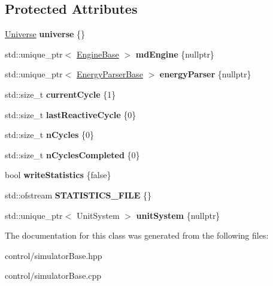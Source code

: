 \subsection*{Protected Attributes}
\begin{DoxyCompactItemize}
\item 
\mbox{\label{classSimulatorBase_a5265c38f77e3fe7f04f02ec446c5220c}} 
\mbox{\hyperlink{classUniverse}{Universe}} {\bfseries universe} \{\}
\item 
\mbox{\label{classSimulatorBase_ae53ac9ac72ac434790a8a19bd1828736}} 
std\+::unique\+\_\+ptr$<$ \mbox{\hyperlink{classEngineBase}{Engine\+Base}} $>$ {\bfseries md\+Engine} \{nullptr\}
\item 
\mbox{\label{classSimulatorBase_a8b8f6b77a9c22a1e7ce1435630f02c1d}} 
std\+::unique\+\_\+ptr$<$ \mbox{\hyperlink{classEnergyParserBase}{Energy\+Parser\+Base}} $>$ {\bfseries energy\+Parser} \{nullptr\}
\item 
\mbox{\label{classSimulatorBase_a22462f697da07f752655b159a7a141c4}} 
std\+::size\+\_\+t {\bfseries current\+Cycle} \{1\}
\item 
\mbox{\label{classSimulatorBase_ac2c917546aa340421e42a5f507a22738}} 
std\+::size\+\_\+t {\bfseries last\+Reactive\+Cycle} \{0\}
\item 
\mbox{\label{classSimulatorBase_a7d76f2a536a62995de4e840e0c0d38c1}} 
std\+::size\+\_\+t {\bfseries n\+Cycles} \{0\}
\item 
\mbox{\label{classSimulatorBase_a7c9bab92a603498956738f4dc43b85aa}} 
std\+::size\+\_\+t {\bfseries n\+Cycles\+Completed} \{0\}
\item 
\mbox{\label{classSimulatorBase_aa8d5f5255226a0cf4bac1e8fd019b221}} 
bool {\bfseries write\+Statistics} \{false\}
\item 
\mbox{\label{classSimulatorBase_a95f485d999dfb1ab7035ac1b8182ac45}} 
std\+::ofstream {\bfseries S\+T\+A\+T\+I\+S\+T\+I\+C\+S\+\_\+\+F\+I\+LE} \{\}
\item 
\mbox{\label{classSimulatorBase_ad74e023d1e506d6d95af9f0d215d2cdb}} 
std\+::unique\+\_\+ptr$<$ Unit\+System $>$ {\bfseries unit\+System} \{nullptr\}
\end{DoxyCompactItemize}


The documentation for this class was generated from the following files\+:\begin{DoxyCompactItemize}
\item 
control/simulator\+Base.\+hpp\item 
control/simulator\+Base.\+cpp\end{DoxyCompactItemize}
